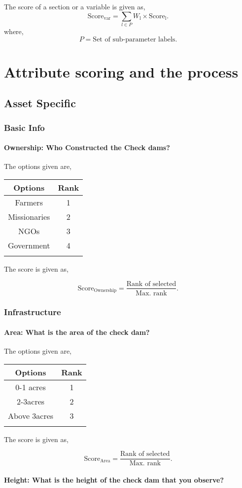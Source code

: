 \documentclass[oneside,twocolumn]{article}
\newcommand{\tsub}[2]{\text{#1}_{\text{#2}}}
\newcommand{\tsubb}[2]{#1_{\text{#2}}}
\newcommand{\dsub}[2]{\dfrac{\text{#1}}{\text{#2}}}
\newcommand{\singsel}[1]
{
	\[
		\tsub{Score}{#1} = \dsub{Rank of selected}{Max. rank}.
	\]
}
\newenvironment{ttable}
{
\begin{center}
\begin{tabular}{c|c}
\hline
}
{
\\ \hline
\end{tabular}
\end{center}
}
\begin{document}
The score of a section or a variable is given as,
\[
	\tsub{Score}{var} = \sum_{l \in P} \tsubb{W}{l} \times \tsub{Score}{l}.
\]
where,
\[
	P = \text{Set of sub-parameter labels.}
\]
\section{Attribute scoring and the
process}
\subsection{Asset Specific}
\subsubsection{Basic Info}

\paragraph{Ownership: Who Constructed the Check dams?}

The options given are,
\begin{ttable}
Options & Rank \\ \hline
Farmers & 1 \\
Missionaries & 2 \\
NGOs & 3 \\
Government & 4 \\
\hline
\end{ttable}
The score is given as,
\singsel{Ownership}
\subsubsection{Infrastructure}

\paragraph{Area: What is the area of the check dam?}

The options given are,
\begin{ttable}
Options & Rank \\ \hline
0-1 acres & 1 \\
2-3acres & 2 \\
Above 3acres & 3 \\
\hline
\end{ttable}
The score is given as,
\singsel{Area}
\paragraph{Height: What is the height of the check dam that you observe?}
\end{document}
